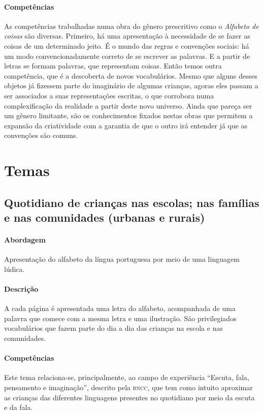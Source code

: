 \documentclass[11pt]{extarticle}
\begin{document}
\paragraph{Competências} 
As competências trabalhadas numa obra do gênero prescritivo como o 
\emph{Alfabeto de coisas} são diversas. 
Primeiro, há uma apresentação à necessidade de se fazer as coisas de um 
determinado jeito. É o mundo das regras e convenções sociais: há um modo 
convencionadamente correto de se escrever as palavras. E a partir de letras 
se formam palavras, que representam coisas. Então temos outra competência, 
que é a descoberta de novos vocabulários. Mesmo que alguns desses objetos já 
fizessem parte do imaginário de algumas crianças, agoras eles passam
a ser associados a suas representações escritas, o que corrobora numa 
complexificação da realidade a partir deste novo universo. Ainda que 
pareça ser um gênero limitante, são os conhecimentos fixados nestas obras 
que permitem a expansão da criatividade com a garantia de que o outro irá 
entender já que as convenções são comuns.

\section{Temas}

\subsection{Quotidiano de crianças nas escolas; nas famílias e nas comunidades (urbanas e rurais)}

\paragraph{Abordagem} 
Apresentação do alfabeto da língua portuguesa por meio de uma linguagem lúdica. 
\paragraph{Descrição} 
A cada página é apresentada uma letra do alfabeto, acompanhada de uma palavra
que comece com a mesma letra e uma ilustração. São privilegiados
vocabulários que fazem parte do dia a dia das crianças na escola e nas
comunidades. 
\paragraph{Competências} 
Este tema relaciona-se, principalmente, ao campo de experiência 
``Escuta, fala, pensamento e imaginação'', descrito pela \textsc{bncc}, 
que tem como intuito aproximar as crianças das diferentes linguagens 
presentes no quotidiano por meio da escuta e da fala.
\end{document}
